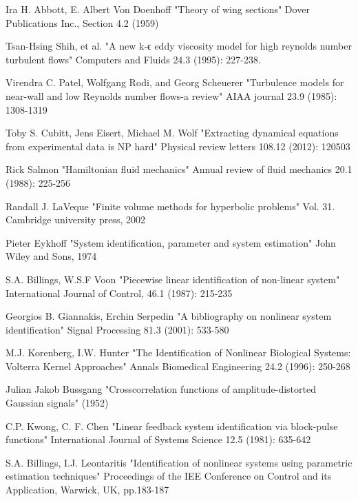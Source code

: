\documentclass[a4paper,onecolumn]{article}
\theoremstyle{remark}
\begin{document}
\begin{thebibliography}{9}
Ira H. Abbott, E. Albert Von Doenhoff
"Theory of wing sections"
Dover Publications Inc., Section 4.2 (1959)

Tsan-Hsing Shih, et al. 
"A new k-ϵ eddy viscosity model for high reynolds number turbulent flows" 
Computers and Fluids 24.3 (1995): 227-238.

Virendra C. Patel, Wolfgang Rodi, and Georg Scheuerer
"Turbulence models for near-wall and low Reynolds number flows-a review"
AIAA journal 23.9 (1985): 1308-1319

Toby S. Cubitt, Jens Eisert, Michael M. Wolf
"Extracting dynamical equations from experimental data is NP hard"
Physical review letters 108.12 (2012): 120503

Rick Salmon 
"Hamiltonian fluid mechanics"
Annual review of fluid mechanics 20.1 (1988): 225-256

Randall J. LaVeque
"Finite volume methods for hyperbolic problems"
Vol. 31. Cambridge university press, 2002

Pieter Eykhoff
"System identification, parameter and system estimation"
John Wiley and Sons, 1974

S.A. Billings, W.S.F Voon
"Piecewise linear identification of non-linear system"
International Journal of Control, 46.1 (1987): 215-235

Georgios B. Giannakis, Erchin Serpedin
"A bibliography on nonlinear system identification"
Signal Processing 81.3 (2001): 533-580

M.J. Korenberg, I.W. Hunter
"The Identification of Nonlinear Biological Systems: Volterra Kernel Approaches"
Annals Biomedical Engineering 24.2 (1996): 250-268

Julian Jakob Bussgang
"Crosscorrelation functions of amplitude-distorted Gaussian signals" 
(1952)

C.P. Kwong, C. F. Chen
"Linear feedback system identification via block-pulse functions"
International Journal of Systems Science 12.5 (1981): 635-642

S.A. Billings, I.J. Leontaritis
"Identification of nonlinear systems using parametric estimation techniques"
Proceedings of the IEE Conference on Control and its Application, Warwick, UK, pp.183-187


\end{thebibliography}
\end{document}
